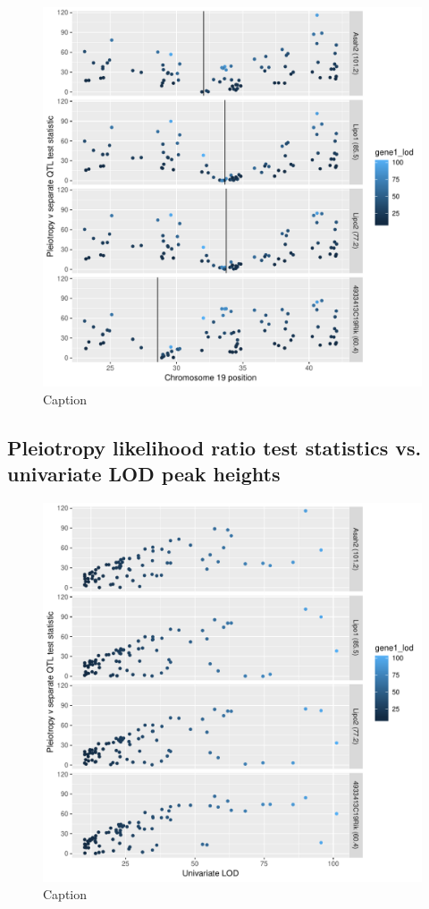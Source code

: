 \documentclass{article}
\begin{document}
\begin{figure}
    \centering
    \includegraphics[width = \textwidth]{../Rmd/lrt-v-middle-of-gene.pdf}
    \caption{Caption}
    \label{fig:middle}
\end{figure}


\subsection{Pleiotropy likelihood ratio test statistics vs. univariate LOD peak heights}

\begin{figure}
    \centering
    \includegraphics[width = \textwidth]{../Rmd/lrt-v-univariate-lod.pdf}
    \caption{Caption}
    \label{fig:lod}
\end{figure}
\end{document}
